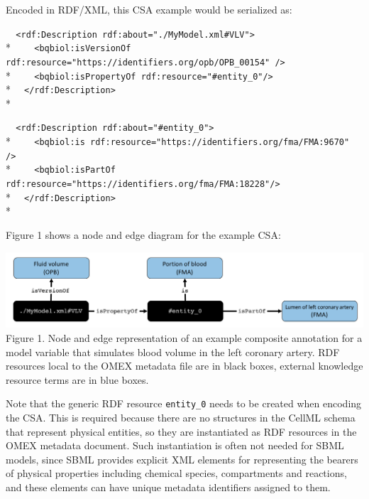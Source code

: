 \documentclass[pdftex,rgb,dvipsnames,svgnames,hyperref,table]{report}
\begin{document}
Encoded in RDF/XML, this CSA example would be serialized as:

  \verb|  <rdf:Description rdf:about="./MyModel.xml#VLV">|\\*
  \verb|    <bqbiol:isVersionOf rdf:resource="https://identifiers.org/opb/OPB_00154" />|\\*
  \verb|    <bqbiol:isPropertyOf rdf:resource="#entity_0"/>|\\*
  \verb|  </rdf:Description>|\\*

  \verb|  <rdf:Description rdf:about="#entity_0">|\\*
  \verb|    <bqbiol:is rdf:resource="https://identifiers.org/fma/FMA:9670" />|\\*
  \verb|    <bqbiol:isPartOf rdf:resource="https://identifiers.org/fma/FMA:18228"/>|\\*
  \verb|  </rdf:Description>|\\*

Figure 1 shows a node and edge diagram for the example CSA:
\vspace{5mm}

\includegraphics[width=\textwidth]{CSAexample.png}
   \footnotesize Figure 1. Node and edge representation of an example composite annotation for a model variable that simulates blood volume in the left coronary artery. RDF resources local to the OMEX metadata file are in black boxes, external knowledge resource terms are in blue boxes.
\vspace{5mm}

\normalsize
Note that the generic RDF resource \texttt{entity\_0} needs to be created when encoding the CSA. This is required because there are no structures in the CellML schema that represent physical entities, so they are instantiated as RDF resources in the OMEX metadata document. Such instantiation is often not needed for SBML models, since SBML provides explicit XML elements for representing the bearers of physical properties including chemical species, compartments and reactions, and these elements can have unique metadata identifiers assigned to them. 
\end{document}
